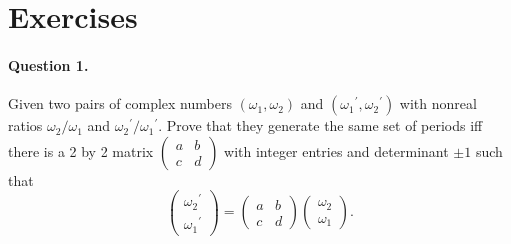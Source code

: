 \section{Exercises}

\paragraph{Question 1.}
\newline
\noindent
Given two pairs of complex numbers $(\omega_1, \omega_2)$ and $({\omega_1}^\prime, {\omega_2}^\prime)$ with nonreal
ratios $\omega_2 / \omega_1$ and ${\omega_2}^\prime / {\omega_1}^\prime$. Prove that they generate the same set of
periods iff there is a 2 by 2 matrix $\begin{pmatrix} a & b \\ c & d \end{pmatrix}$ with integer entries and
determinant $\pm 1$ such that $$
\begin{pmatrix} {\omega_2}^\prime \\ {\omega_1}^\prime \end{pmatrix} =
\begin{pmatrix} a & b \\ c & d \end{pmatrix} \begin{pmatrix} \omega_2 \\ \omega_1 \end{pmatrix}.
$$